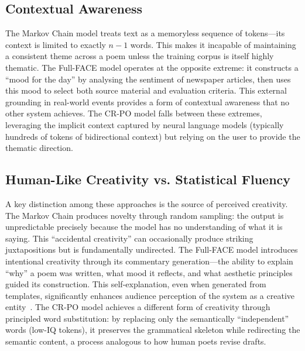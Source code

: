 \documentclass[conference]{IEEEtran}
\begin{document}
\subsection{Contextual Awareness}

The Markov Chain model treats text as a memoryless sequence of tokens---its context is limited to exactly $n{-}1$ words. This makes it incapable of maintaining a consistent theme across a poem unless the training corpus is itself highly thematic. The Full-FACE model operates at the opposite extreme: it constructs a ``mood for the day'' by analysing the sentiment of newspaper articles, then uses this mood to select both source material and evaluation criteria. This external grounding in real-world events provides a form of contextual awareness that no other system achieves. The CR-PO model falls between these extremes, leveraging the implicit context captured by neural language models (typically hundreds of tokens of bidirectional context) but relying on the user to provide the thematic direction.

\subsection{Human-Like Creativity vs. Statistical Fluency}

A key distinction among these approaches is the source of perceived creativity. The Markov Chain produces novelty through random sampling: the output is unpredictable precisely because the model has no understanding of what it is saying. This ``accidental creativity'' can occasionally produce striking juxtapositions but is fundamentally undirected. The Full-FACE model introduces intentional creativity through its commentary generation---the ability to explain ``why'' a poem was written, what mood it reflects, and what aesthetic principles guided its construction. This self-explanation, even when generated from templates, significantly enhances audience perception of the system as a creative entity~\cite{colton2012face}. The CR-PO model achieves a different form of creativity through principled word substitution: by replacing only the semantically ``independent'' words (low-IQ tokens), it preserves the grammatical skeleton while redirecting the semantic content, a process analogous to how human poets revise drafts.


\end{document}
